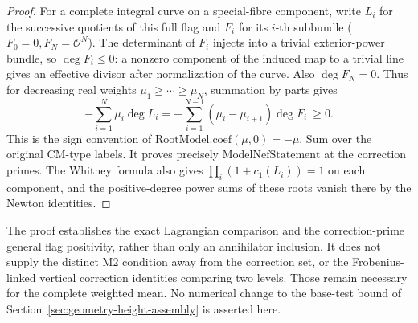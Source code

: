 \begin{proof}
For a complete integral curve on a special-fibre component,
write \(L_i\) for the successive quotients of this full flag and
\(F_i\) for its \(i\)-th subbundle (\(F_0=0,F_N=\mathcal O^N\)).
The determinant of \(F_i\) injects into a trivial exterior-power
bundle, so \(\deg F_i\le0\): a nonzero component of the induced
map to a trivial line gives an effective divisor after normalization
of the curve. Also \(\deg F_N=0\). Thus for decreasing real
weights \(\mu_1\ge\cdots\ge\mu_N\), summation by parts gives
\[
 -\sum_{i=1}^N\mu_i\deg L_i
 =-\sum_{i=1}^{N-1}(\mu_i-\mu_{i+1})\deg F_i\ \ge0 .
 \tag{HF4}
\]
This is the sign convention of
\(\mathrm{RootModel.coef}(\mu,0)=-\mu\).
Sum over the original CM-type labels. It proves precisely
\(\mathrm{ModelNefStatement}\) at the correction primes.
The Whitney formula also gives
\(\prod_i(1+c_1(L_i))=1\) on each component, and the positive-degree
power sums of these roots vanish there by the Newton identities.
\end{proof}

The proof establishes the exact Lagrangian comparison and the
correction-prime general flag positivity, rather than only an
annihilator inclusion. It does not supply the distinct \(\mathrm{M2}\)
condition away from the correction set, or the Frobenius-linked
vertical correction identities comparing two levels. Those remain
necessary for the complete weighted mean. No numerical change to
the base-test bound of Section~\ref{sec:geometry-height-assembly}
is asserted here.
